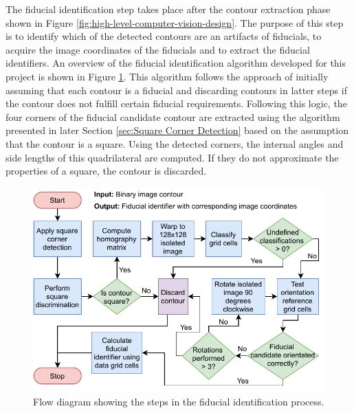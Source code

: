 The fiducial identification step takes place after the contour extraction phase shown in Figure \ref{fig:high-level-computer-vision-design}. The purpose of this step is to identify which of the detected contours are an artifacts of fiducials, to acquire the image coordinates of the fiducials and to extract the fiducial identifiers. An overview of the fiducial identification algorithm developed for this project is shown in Figure \ref{fig:fiducial-identification}. This algorithm follows the approach of initially assuming that each contour is a fiducial and discarding contours in latter steps if the contour does not fulfill certain fiducial requirements. Following this logic, the four corners of the fiducial candidate contour are extracted using the algorithm presented in later Section \ref{sec:Square Corner Detection} based on the assumption that the contour is a square. Using the detected corners, the internal angles and side lengths of this quadrilateral are computed. If they do not approximate the properties of a square, the contour is discarded.

\begin{figure}[!ht]
	\centering
	\includegraphics[scale=1]{figures/fiducial-identification.pdf}
	\caption{Flow diagram showing the steps in the fiducial identification process.}
	\label{fig:fiducial-identification}
\end{figure}


